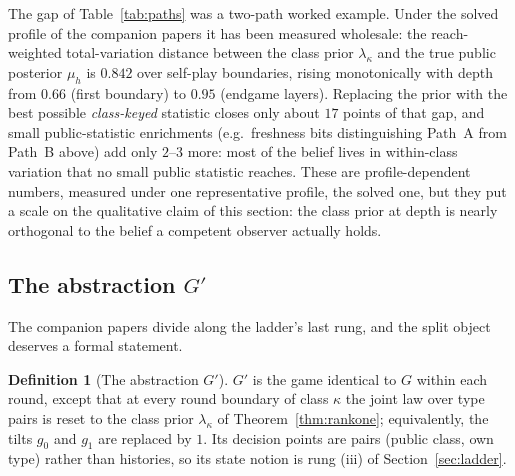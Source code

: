 \documentclass[11pt]{article}
\theoremstyle{plain}
\theoremstyle{definition}
\newtheorem{definition}[theorem]{Definition}
\theoremstyle{remark}
\begin{document}
The gap of Table~\ref{tab:paths} was a two-path worked example. Under the
solved profile of the companion papers it has been measured wholesale:
the reach-weighted total-variation distance between the class prior
$\lambda_\kappa$ and the true public posterior $\mu_h$ is
$\mathbf{0.842}$ over self-play boundaries, rising monotonically with
depth from $0.66$ (first boundary) to $0.95$ (endgame layers). Replacing
the prior with the best possible \emph{class-keyed} statistic closes only
about $17$ points of that gap, and small public-statistic enrichments
(e.g.\ freshness bits distinguishing Path~A from Path~B above) add only
$2$--$3$ more: most of the belief lives in within-class variation that no
small public statistic reaches. These are profile-dependent numbers,
measured under one representative profile, the solved one, but they put a
scale on the qualitative claim of this section: the class prior at depth
is nearly orthogonal to the belief a competent observer actually holds.

\subsection{The abstraction $G'$}

The companion papers divide along the ladder's last rung, and the split
object deserves a formal statement.

\begin{definition}[The abstraction $G'$]\label{def:gprime}
$G'$ is the game identical to $G$ within each round, except that at every
round boundary of class $\kappa$ the joint law over type pairs is reset to
the class prior $\lambda_\kappa$ of Theorem~\ref{thm:rankone};
equivalently, the tilts $g_0$ and $g_1$ are replaced by $1$. Its decision
points are pairs (public class, own type) rather than histories, so its
state notion is rung (iii) of Section~\ref{sec:ladder}.
\end{definition}
\end{document}
